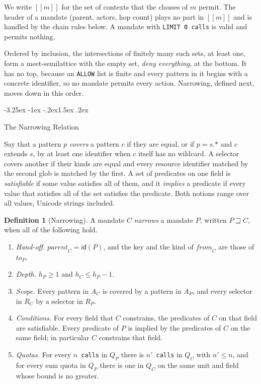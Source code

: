 \documentclass[10pt,twocolumn]{article}
\makeatletter
\theoremstyle{plain}
\theoremstyle{definition}
\newtheorem{definition}{Definition}
\newcommand{\sem}[1]{[\![#1]\!]}
\newcommand{\covers}{\sqsupseteq}
\renewcommand\subsection{\@startsection{subsection}{2}{\z@}%
  {-3.25ex \@plus -1ex \@minus -.2ex}{1.5ex \@plus .2ex}%
  {\normalfont\large\bfseries\raggedright}}
\makeatother
\begin{document}
We write $\sem{m}$ for the set of contexts that the clauses of $m$ permit. The header of a mandate (parent, actors, hop count) plays no part in $\sem{m}$ and is handled by the chain rules below. A mandate with \texttt{LIMIT 0 calls} is valid and permits nothing.

Ordered by inclusion, the intersections of finitely many such sets, at least one, form a meet-semilattice with the empty set, \emph{deny everything}, at the bottom. It has no top, because an \texttt{ALLOW} list is finite and every pattern in it begins with a concrete identifier, so no mandate permits every action. Narrowing, defined next, moves down in this order.

\subsection{The Narrowing Relation}
\label{sec:laws}

Say that a pattern $p$ \emph{covers} a pattern $c$ if they are equal, or if $p = s\texttt{.*}$ and $c$ extends $s$, by at least one identifier when $c$ itself has no wildcard. A selector covers another if their kinds are equal and every resource identifier matched by the second glob is matched by the first. A set of predicates on one field is \emph{satisfiable} if some value satisfies all of them, and it \emph{implies} a predicate if every value that satisfies all of the set satisfies the predicate. Both notions range over all values, Unicode strings included.

\begin{definition}[Narrowing]
\label{def:narrowing}
A mandate $C$ \emph{narrows} a mandate $P$, written $P \covers C$, when all of the following hold.
\begin{enumerate}[leftmargin=*,itemsep=0pt,topsep=2pt,label=(N\arabic*)]
  \item \emph{Hand-off.} $\mathit{parent}_C = \mathsf{id}(P)$, and the key and the kind of $\mathit{from}_C$ are those of $\mathit{to}_P$.
  \item \emph{Depth.} $h_P \ge 1$ and $h_C \le h_P - 1$.
  \item \emph{Scope.} Every pattern in $A_C$ is covered by a pattern in $A_P$, and every selector in $R_C$ by a selector in $R_P$.
  \item \emph{Conditions.} For every field that $C$ constrains, the predicates of $C$ on that field are satisfiable. Every predicate of $P$ is implied by the predicates of $C$ on the same field; in particular $C$ constrains that field.
  \item \emph{Quotas.} For every $n$~\texttt{calls} in $Q_P$ there is $n'$~\texttt{calls} in $Q_C$ with $n' \le n$, and for every sum quota in $Q_P$ there is one in $Q_C$ on the same unit and field whose bound is no greater.
\end{enumerate}
\end{definition}
\end{document}
